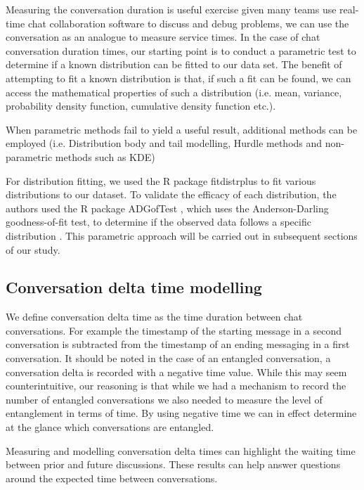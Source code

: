 Measuring the conversation duration is useful exercise given many teams use real-time chat collaboration software to discuss and debug problems, we can use the conversation as an analogue to measure service times. In the case of chat conversation duration times, our starting point is to conduct a parametric test to determine if a known distribution can be fitted to our data set. The benefit of attempting to fit a known distribution is that, if such a fit can be found, we can access the mathematical properties of such a distribution (i.e. mean, variance, probability density function, cumulative density function etc.). 

When parametric methods fail to yield a useful result, additional methods can be employed (i.e. Distribution body and tail modelling, Hurdle methods and non-parametric methods such as KDE)

For distribution fitting, we used the R package fitdistrplus \cite{fitdistrplus} to fit various distributions to our dataset. To validate the efficacy of each distribution,  the authors used the R package ADGofTest \cite{ADGoF}, which uses the Anderson-Darling goodness-of-fit test, to determine if the observed data follows a specific distribution \cite {anderson1952asymptotic}. This parametric approach will be carried out in subsequent sections of our study.

\subsection{Conversation delta time modelling}

We define conversation delta time as the time duration between chat conversations. For example the timestamp of the starting message in a second conversation is subtracted from the timestamp of an ending messaging in a first conversation. It should be noted in the case of an entangled conversation, a conversation delta is recorded with a negative time value. While this may seem counterintuitive, our reasoning is that while we had a mechanism to record the number of entangled conversations we also needed to measure the level of entanglement in terms of time. By using negative time we can in effect determine at the glance which conversations are entangled.

Measuring and modelling conversation delta times can highlight the waiting time between prior and future discussions. These results can help answer questions around the expected time between conversations. 

